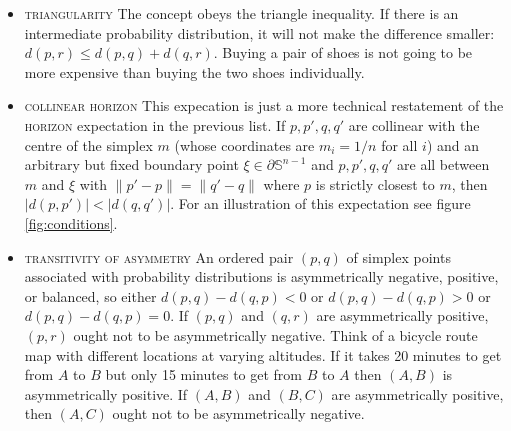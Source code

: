 \documentclass[smallextended]{svjour3}       %
\begin{document}
\begin{itemize}
\item \textsc{triangularity} The concept obeys the triangle
  inequality. If there is an intermediate probability distribution, it
  will not make the difference smaller: $d(p,r)\leq{}d(p,q)+d(q,r)$.
  Buying a pair of shoes is not going to be more expensive than buying
  the two shoes individually.
\item \textsc{collinear horizon} This expecation is just a more
  technical restatement of the \textsc{horizon} expectation in the
  previous list. If $p,p',q,q'$ are collinear with the centre of the
  simplex $m$ (whose coordinates are $m_{i}=1/n$ for all $i$) and an
  arbitrary but fixed boundary point $\xi\in\partial\mathbb{S}^{n-1}$
  and $p,p',q,q'$ are all between $m$ and $\xi$ with
  $\|p'-p\|=\|q'-q\|$ where $p$ is strictly closest to $m$, then
  $|d(p,p')|<|d(q,q')|$. For an illustration of this expectation see
  figure \ref{fig:conditions}. 
\item \textsc{transitivity of asymmetry} An ordered pair $(p,q)$ of
  simplex points associated with probability distributions is
  asymmetrically negative, positive, or balanced, so either
  $d(p,q)-d(q,p)<0$ or $d(p,q)-d(q,p)>0$ or $d(p,q)-d(q,p)=0$. If
  $(p,q)$ and $(q,r)$ are asymmetrically positive, $(p,r)$ ought not
  to be asymmetrically negative. Think of a bicycle route map with
  different locations at varying altitudes. If it takes 20 minutes to
  get from $A$ to $B$ but only 15 minutes to get from $B$ to $A$ then
  $(A,B)$ is asymmetrically positive. If $(A,B)$ and $(B,C)$ are
  asymmetrically positive, then $(A,C)$ ought not to be asymmetrically
  negative.
\end{itemize}
\end{document}
